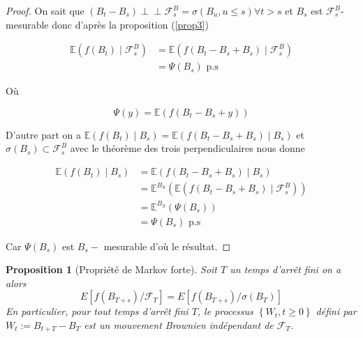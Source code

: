 \documentclass[A4paper,12pt]{report}
\def\Perp{\perp\!\!\!\perp}
\newtheorem{proposition}{Proposition}[chapter]
\begin{document}
\begin{proof}
On sait que $\left(B_{t}-B_{s}\right) \Perp \mathcal{F}_{s}^{B}=\sigma\left(B_{u}, u \leq s\right) \forall t>s$ et $B_{s}$ est $\mathcal{F}_{s}^{B}$-mesurable donc d'après la proposition (\ref{prop3})

$$
\begin{aligned}
\mathbb{E}\left(f\left(B_{t}\right) \mid \mathcal{F}_{s}^{B}\right) & =\mathbb{E}\left(f\left(B_{t}-B_{s}+B_{s}\right) \mid \mathcal{F}_{s}^{B}\right) \\
& =\Psi\left(B_{s}\right) \text{ p.s}
\end{aligned}
$$

Où

$$
\Psi(y)=\mathbb{E}\left(f\left(B_{t}-B_{s}+y\right)\right)
$$

D'autre part on a $\mathbb{E}\left(f\left(B_{t}\right) \mid B_{s}\right)=\mathbb{E}\left(f\left(B_{t}-B_{s}+B_{s}\right) \mid B_{s}\right)$ et $\sigma\left(B_{s}\right) \subset \mathcal{F}_{s}^{B}$ avec le théorème des trois perpendiculaires nous donne

$$
\begin{aligned}
\mathbb{E}\left(f\left(B_{t}\right) \mid B_{s}\right) & =\mathbb{E}\left(f\left(B_{t}-B_{s}+B_{s}\right) \mid B_{s}\right) \\
& =\mathbb{E}^{B_{S}}\left(\mathbb{E}\left(f\left(B_{t}-B_{s}+B_{s}\right) \mid \mathcal{F}_{s}^{B}\right)\right) \\
& =\mathbb{E}^{B_{S}}\left(\Psi\left(B_{s}\right)\right) \\
& =\Psi\left(B_{s}\right) \text{ p.s}
\end{aligned}
$$

Car $\Psi\left(B_{s}\right)$ est $B_{s}-$ mesurable d'où le résultat.
\end{proof}
\begin{proposition}[Propriété de Markov forte]
Soit $T$ un temps d'arrêt fini on a alors
$$
E\left[f\left(B_{T+s}\right) / \mathcal{F}_{T}\right]=E\left[f\left(B_{T+s}\right) / \sigma\left(B_{T}\right)\right]
$$
En particulier, pour tout temps d'arrêt fini $T$, le processus $\left\{W_{t}, t \geq 0\right\}$ défini par $W_{t}:=B_{t+T}-B_{T}$ est un mouvement Brownien indépendant de $\mathcal{F}_{T}$.
\end{proposition}
\end{document}
